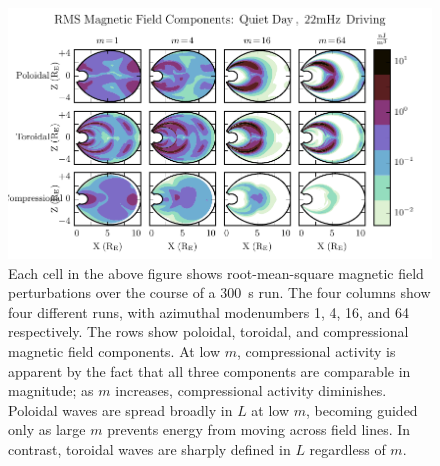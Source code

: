 \documentclass{article}
\newcommand{\azm}{\ensuremath{m}\xspace}
\begin{document}

\begin{figure}
    \begin{center}
    \includegraphics[width=\textwidth]{figures/fig_brms.pdf}
    \caption{
        Each cell in the above figure shows root-mean-square magnetic field perturbations over the course of a \SI{300}{\s} run. The four columns show four different runs, with azimuthal modenumbers 1, 4, 16, and 64 respectively. The rows show poloidal, toroidal, and compressional magnetic field components. At low \azm, compressional activity is apparent by the fact that all three components are comparable in magnitude; as \azm increases, compressional activity diminishes. Poloidal waves are spread broadly in $L$ at low \azm, becoming guided only as large \azm prevents energy from moving across field lines. In contrast, toroidal waves are sharply defined in $L$ regardless of \azm.
    }
    \label{fig_brms}
    \end{center}
\end{figure}

\end{document}
